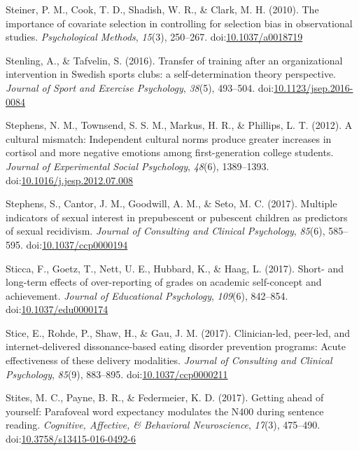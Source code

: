 \documentclass[english,man]{apa6}
\begin{document}
\hypertarget{ref-Steiner2010}{}
Steiner, P. M., Cook, T. D., Shadish, W. R., \& Clark, M. H. (2010). The
importance of covariate selection in controlling for selection bias in
observational studies. \emph{Psychological Methods}, \emph{15}(3),
250--267. doi:\href{https://doi.org/10.1037/a0018719}{10.1037/a0018719}

\hypertarget{ref-Stenling2016}{}
Stenling, A., \& Tafvelin, S. (2016). Transfer of training after an
organizational intervention in Swedish sports clubs: a
self-determination theory perspective. \emph{Journal of Sport and
Exercise Psychology}, \emph{38}(5), 493--504.
doi:\href{https://doi.org/10.1123/jsep.2016-0084}{10.1123/jsep.2016-0084}

\hypertarget{ref-Stephens2012}{}
Stephens, N. M., Townsend, S. S. M., Markus, H. R., \& Phillips, L. T.
(2012). A cultural mismatch: Independent cultural norms produce greater
increases in cortisol and more negative emotions among first-generation
college students. \emph{Journal of Experimental Social Psychology},
\emph{48}(6), 1389--1393.
doi:\href{https://doi.org/10.1016/j.jesp.2012.07.008}{10.1016/j.jesp.2012.07.008}

\hypertarget{ref-Stephens2017a}{}
Stephens, S., Cantor, J. M., Goodwill, A. M., \& Seto, M. C. (2017).
Multiple indicators of sexual interest in prepubescent or pubescent
children as predictors of sexual recidivism. \emph{Journal of Consulting
and Clinical Psychology}, \emph{85}(6), 585--595.
doi:\href{https://doi.org/10.1037/ccp0000194}{10.1037/ccp0000194}

\hypertarget{ref-Sticca2017}{}
Sticca, F., Goetz, T., Nett, U. E., Hubbard, K., \& Haag, L. (2017).
Short- and long-term effects of over-reporting of grades on academic
self-concept and achievement. \emph{Journal of Educational Psychology},
\emph{109}(6), 842--854.
doi:\href{https://doi.org/10.1037/edu0000174}{10.1037/edu0000174}

\hypertarget{ref-Stice2017a}{}
Stice, E., Rohde, P., Shaw, H., \& Gau, J. M. (2017). Clinician-led,
peer-led, and internet-delivered dissonance-based eating disorder
prevention programs: Acute effectiveness of these delivery modalities.
\emph{Journal of Consulting and Clinical Psychology}, \emph{85}(9),
883--895.
doi:\href{https://doi.org/10.1037/ccp0000211}{10.1037/ccp0000211}

\hypertarget{ref-Stites2017}{}
Stites, M. C., Payne, B. R., \& Federmeier, K. D. (2017). Getting ahead
of yourself: Parafoveal word expectancy modulates the N400 during
sentence reading. \emph{Cognitive, Affective, \& Behavioral
Neuroscience}, \emph{17}(3), 475--490.
doi:\href{https://doi.org/10.3758/s13415-016-0492-6}{10.3758/s13415-016-0492-6}
\end{document}
